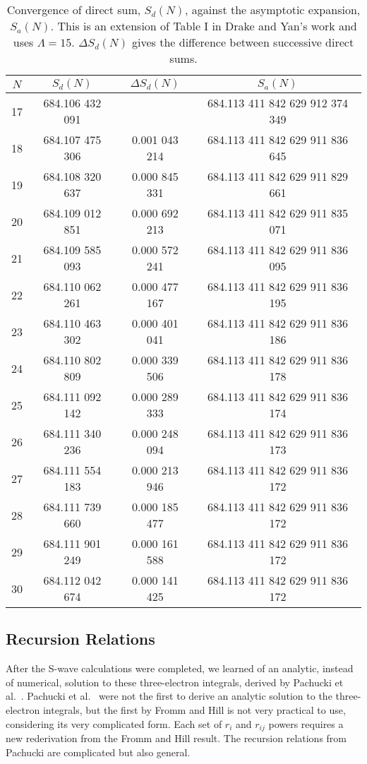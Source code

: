 \documentclass[Dissertation.tex]{subfiles}
\begin{document}
\begin{table}[H]
\centering
\begin{tabular}{c c c c}
\toprule
$N$ & $S_d(N)$ & $\Delta S_d(N)$ & $S_a(N)$ \\
\midrule
17 & 684.106 432 091 &               & 684.113 411 842 629 912 374 349 \\
18 & 684.107 475 306 & 0.001 043 214 & 684.113 411 842 629 911 836 645 \\
19 & 684.108 320 637 & 0.000 845 331 & 684.113 411 842 629 911 829 661 \\
20 & 684.109 012 851 & 0.000 692 213 & 684.113 411 842 629 911 835 071 \\
21 & 684.109 585 093 & 0.000 572 241 & 684.113 411 842 629 911 836 095 \\
22 & 684.110 062 261 & 0.000 477 167 & 684.113 411 842 629 911 836 195 \\
23 & 684.110 463 302 & 0.000 401 041 & 684.113 411 842 629 911 836 186 \\
24 & 684.110 802 809 & 0.000 339 506 & 684.113 411 842 629 911 836 178 \\
25 & 684.111 092 142 & 0.000 289 333 & 684.113 411 842 629 911 836 174 \\
26 & 684.111 340 236 & 0.000 248 094 & 684.113 411 842 629 911 836 173 \\
27 & 684.111 554 183 & 0.000 213 946 & 684.113 411 842 629 911 836 172 \\
28 & 684.111 739 660 & 0.000 185 477 & 684.113 411 842 629 911 836 172 \\
29 & 684.111 901 249 & 0.000 161 588 & 684.113 411 842 629 911 836 172 \\
30 & 684.112 042 674 & 0.000 141 425 & 684.113 411 842 629 911 836 172 \\
\bottomrule
\end{tabular}
\caption[Convergence of direct sum, $S_d(N)$, against the asymptotic expansion, $S_a(N)$.]{Convergence of direct sum, $S_d(N)$, against the asymptotic expansion, $S_a(N)$. This is an extension of Table I in Drake and Yan's work \cite{Drake1995} and uses $\Lambda = 15$. $\Delta S_d(N)$ gives the difference between successive direct sums.}
\label{tab:AsympExpan}
\end{table}

\subsection{Recursion Relations}
\label{sec:RecursionRelations}
After the S-wave calculations were completed, we learned of an analytic, instead of numerical, solution to these three-electron integrals, derived by Pachucki et al.\ \cite{Pachucki2004}. Pachucki et al.\ \cite{Pachucki2004} were not the first to derive an analytic solution to the three-electron integrals, but the first by Fromm and Hill \cite{Fromm1987} is not very practical to use, considering its very complicated form. Each set of $r_i$ and $r_{ij}$ powers requires a new rederivation from the Fromm and Hill result. The recursion relations from Pachucki are complicated but also general.
\end{document}
